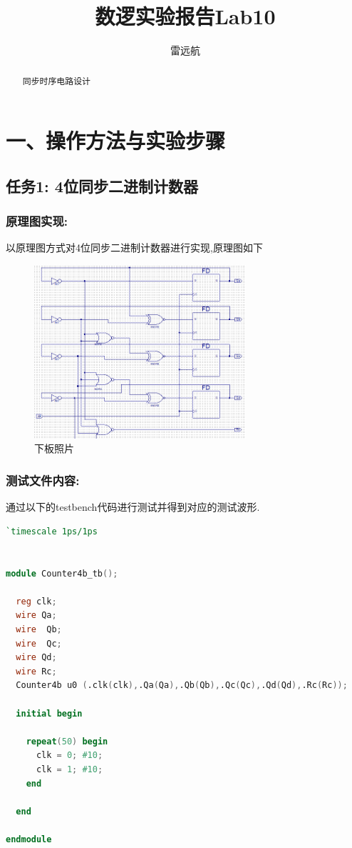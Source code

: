 \documentclass{article}
\title{数逻实验报告Lab10}
\author{雷远航}
\begin{document}
\maketitle

\begin{abstract}
    同步时序电路设计
\end{abstract}

\section*{一、操作方法与实验步骤}

\subsection*{任务1: 4位同步二进制计数器}

\subsubsection*{原理图实现:}
以原理图方式对4位同步二进制计数器进行实现,原理图如下
\begin{figure}[H]
    \centering
    \includegraphics[width=0.7\textwidth]{lab10p/14.png}
    \caption{\label{Lab10}下板照片}
    \end{figure}

\subsubsection*{测试文件内容:}

通过以下的testbench代码进行测试并得到对应的测试波形.
\begin{lstlisting}[language=verilog]
    `timescale 1ps/1ps


module Counter4b_tb();
  
  reg clk;
  wire Qa;
  wire  Qb; 
  wire  Qc;
  wire Qd;
  wire Rc;
  Counter4b u0 (.clk(clk),.Qa(Qa),.Qb(Qb),.Qc(Qc),.Qd(Qd),.Rc(Rc));
  
  initial begin
    
    repeat(50) begin
      clk = 0; #10;
      clk = 1; #10;
    end
   
  end

endmodule 
\end{lstlisting}
\end{document}
